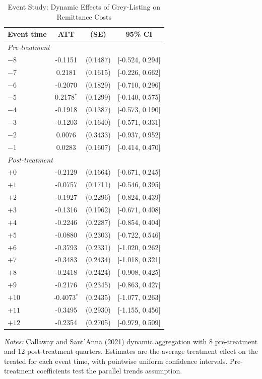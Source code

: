 \begin{table}[H]
\centering
\caption{Event Study: Dynamic Effects of Grey-Listing on Remittance Costs}
\label{tab:eventstudy}
\begin{threeparttable}
\begin{tabular}{l ccc}
\toprule
Event time & ATT & (SE) & 95\% CI \\
\midrule
\multicolumn{4}{l}{\textit{Pre-treatment}} \\
$-8$ & -0.1151 & (0.1487) & [-0.524, 0.294] \\
$-7$ & 0.2181 & (0.1615) & [-0.226, 0.662] \\
$-6$ & -0.2070 & (0.1829) & [-0.710, 0.296] \\
$-5$ & 0.2178$^{*}$ & (0.1299) & [-0.140, 0.575] \\
$-4$ & -0.1918 & (0.1387) & [-0.573, 0.190] \\
$-3$ & -0.1203 & (0.1640) & [-0.571, 0.331] \\
$-2$ & 0.0076 & (0.3433) & [-0.937, 0.952] \\
$-1$ & 0.0283 & (0.1607) & [-0.414, 0.470] \\
\midrule
\multicolumn{4}{l}{\textit{Post-treatment}} \\
$+0$ & -0.2129 & (0.1664) & [-0.671, 0.245] \\
$+1$ & -0.0757 & (0.1711) & [-0.546, 0.395] \\
$+2$ & -0.1927 & (0.2296) & [-0.824, 0.439] \\
$+3$ & -0.1316 & (0.1962) & [-0.671, 0.408] \\
$+4$ & -0.2246 & (0.2287) & [-0.854, 0.404] \\
$+5$ & -0.0880 & (0.2303) & [-0.722, 0.546] \\
$+6$ & -0.3793 & (0.2331) & [-1.020, 0.262] \\
$+7$ & -0.3483 & (0.2434) & [-1.018, 0.321] \\
$+8$ & -0.2418 & (0.2424) & [-0.908, 0.425] \\
$+9$ & -0.2176 & (0.2345) & [-0.863, 0.427] \\
$+10$ & -0.4073$^{*}$ & (0.2435) & [-1.077, 0.263] \\
$+11$ & -0.3495 & (0.2930) & [-1.155, 0.456] \\
$+12$ & -0.2354 & (0.2705) & [-0.979, 0.509] \\
\bottomrule
\end{tabular}
\begin{tablenotes}[flushleft]
\small
\item \textit{Notes:} Callaway and Sant'Anna (2021) dynamic aggregation with 8 pre-treatment and 12 post-treatment quarters. Estimates are the average treatment effect on the treated for each event time, with pointwise uniform confidence intervals. Pre-treatment coefficients test the parallel trends assumption.
\end{tablenotes}
\end{threeparttable}
\end{table}
